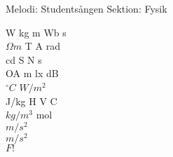 \begin{song}


\begin{songmeta}
Melodi: Studentsången
Sektion: Fysik
\end{songmeta}

\noindent W kg m Wb s \\
$\Omega{}m$ T A rad \\
cd S N s \\
OA m lx dB \\
$^{\circ}C$ $W/m^2$ \\
J/kg H V C \\
$kg/m^3$ mol \\
$m/s^2$ \\
$m/s^2$ \\
$F!$

\end{song}
